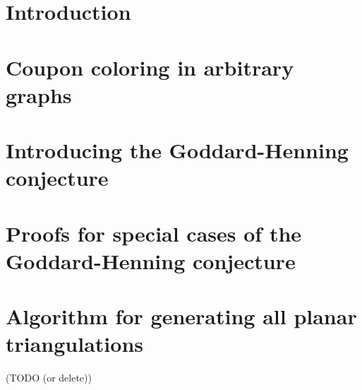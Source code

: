 \documentclass[12pt]{report}
\begin{document}


\newpage\null\thispagestyle{empty}\newpage

\tableofcontents

\chapter*{Introduction}


\chapter{Coupon coloring in arbitrary graphs}


\chapter{Introducing the Goddard-Henning conjecture}


\chapter{Proofs for special cases of the Goddard-Henning conjecture}


\chapter{Algorithm for generating all planar triangulations} (TODO (or delete))


\end{document}

